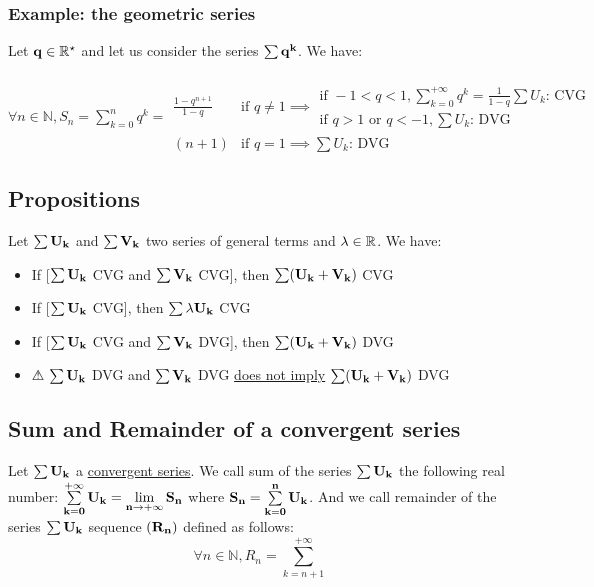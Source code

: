 \documentclass[notitlepage]{math}
\begin{document}
\subsubsection{Example: the geometric series}
Let $\bf q \in \mathbb{R}^\star$ and let us consider the series $\bf \sum q^k$. We have:\\
\\
    $\forall n \in \mathbb{N}, S_n = \sum\limits_{k=0}^n q^k = \begin{array}{|rl}
        \frac{1 - q^{n+1}}{1 - q} & \text{if } q \neq 1  \implies
        \begin{array}{|r}
            \text{if } \minus 1 < q < 1, \sum\limits_{k=0}^{+\infty} q^k = \frac{1}{1-q} \sum U_k \text{: CVG} \\
            \text{if } q > 1 \text{ or } q < \minus 1, \sum U_k \text{: DVG} 
        \end{array} \\
        (n + 1) & \text{if } q = 1 \implies \sum U_k \text{: DVG}
    \end{array}$

\subsection{Propositions}
Let $\bf \sum U_k$ and $\bf \sum V_k$ two series of general terms and $\bf \lambda \in \mathbb{R}$. We have:
\begin{itemize}
    \item If [$\bf \sum U_k$ CVG and $\bf \sum V_k$ CVG], then $\bf \sum (U_k + V_k)$ CVG
    \item If [$\bf \sum U_k$ CVG], then $\bf \sum \lambda U_k$ CVG
    \item If [$\bf \sum U_k$ CVG and $\bf \sum V_k$ DVG], then $\bf \sum (U_k + V_k)$ DVG
    \item ⚠ $\bf \sum U_k$ DVG and $\bf \sum V_k$ DVG \underline{does not imply} $\bf \sum (U_k + V_k)$ DVG
\end{itemize}

\subsection{Sum and Remainder of a convergent series}
Let $\bf \sum U_k$ a \underline{convergent series}. We call sum of the series $\bf \sum U_k$ 
the following real number: $\bf \sum\limits_{k=0}^{+\infty} U_k = \lim\limits_{n \to +\infty} S_n$ where $\bf {S_n} = \sum\limits_{k=0}^n U_k$.
And we call remainder of the series $\bf \sum U_k$ sequence $\bf (R_n)$ defined as follows:
\[ \forall n \in \mathbb{N}, R_n = \sum\limits_{k=n+1}^{+\infty}\]
\end{document}
